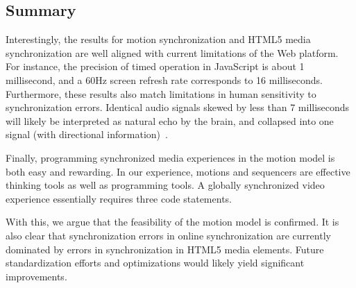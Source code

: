 \subsection {Summary}

Interestingly, the results for motion synchronization and HTML5 media
synchronization are well aligned with current limitations of the Web platform.
For instance, the precision of timed operation in JavaScript is about 1
millisecond, and a 60Hz screen refresh rate corresponds to 16 milliseconds.
Furthermore, these results also match limitations in human sensitivity to
synchronization errors. Identical audio signals skewed by less than 7
milliseconds will likely be interpreted as natural echo by the brain, and
collapsed into one signal (with directional information)~\cite{syncreport2}.

Finally, programming synchronized media experiences in the motion model is
both easy and rewarding. In our experience, motions and sequencers are
effective thinking tools as well as programming tools. A globally synchronized
video experience essentially requires three code statements.

With this, we argue that the feasibility of the motion model is confirmed. It
is also clear that synchronization errors in online synchronization are
currently dominated by errors in synchronization in HTML5 media elements.
Future standardization efforts and optimizations would likely yield
significant improvements.